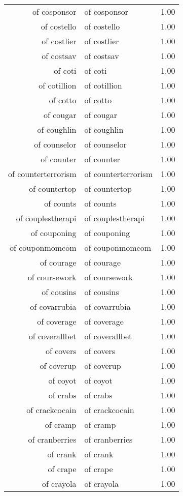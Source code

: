 \begin{table}[ht]
\begin{tabular}{rlr}
  of cosponsor & of cosponsor & 1.00 \\ 
  of costello & of costello & 1.00 \\ 
  of costlier & of costlier & 1.00 \\ 
  of costsav & of costsav & 1.00 \\ 
  of coti & of coti & 1.00 \\ 
  of cotillion & of cotillion & 1.00 \\ 
  of cotto & of cotto & 1.00 \\ 
  of cougar & of cougar & 1.00 \\ 
  of coughlin & of coughlin & 1.00 \\ 
  of counselor & of counselor & 1.00 \\ 
  of counter & of counter & 1.00 \\ 
  of counterterrorism & of counterterrorism & 1.00 \\ 
  of countertop & of countertop & 1.00 \\ 
  of counts & of counts & 1.00 \\ 
  of couplestherapi & of couplestherapi & 1.00 \\ 
  of couponing & of couponing & 1.00 \\ 
  of couponmomcom & of couponmomcom & 1.00 \\ 
  of courage & of courage & 1.00 \\ 
  of coursework & of coursework & 1.00 \\ 
  of cousins & of cousins & 1.00 \\ 
  of covarrubia & of covarrubia & 1.00 \\ 
  of coverage & of coverage & 1.00 \\ 
  of coverallbet & of coverallbet & 1.00 \\ 
  of covers & of covers & 1.00 \\ 
  of coverup & of coverup & 1.00 \\ 
  of coyot & of coyot & 1.00 \\ 
  of crabs & of crabs & 1.00 \\ 
  of crackcocain & of crackcocain & 1.00 \\ 
  of cramp & of cramp & 1.00 \\ 
  of cranberries & of cranberries & 1.00 \\ 
  of crank & of crank & 1.00 \\ 
  of crape & of crape & 1.00 \\ 
  of crayola & of crayola & 1.00 \\ 

\end{tabular}
\end{table}
